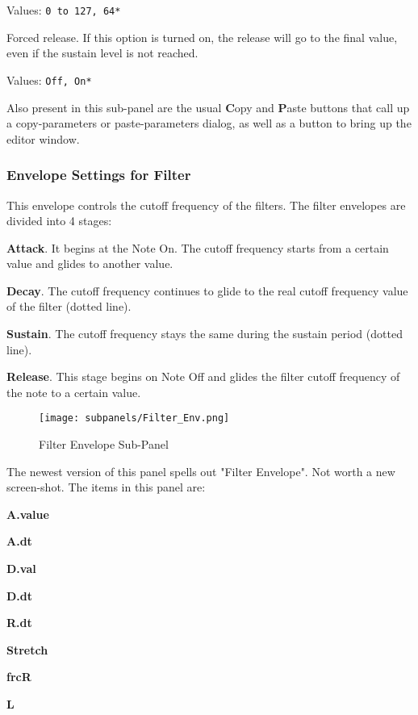    Values: \texttt{0 to 127, 64*}

   Forced release.
   If this option is turned on, the release will go to the
   final value, even if the sustain level is not reached.

   Values: \texttt{Off, On*}

   Also present in this sub-panel are the usual \textbf{C}opy
   and \textbf{P}aste buttons that call up a copy-parameters or
   paste-parameters dialog, as well as a button
   to bring up the editor window.

\subsubsection{Envelope Settings for Filter}
\label{subsubsec:envelope_settings_for_filter}

   This envelope controls the cutoff frequency of the filters.
   The filter envelopes are divided into 4 stages:

   \begin{enumber}
      \item \textbf{Attack}.
         It begins at the Note On.
         The cutoff frequency starts from a certain value and glides to another
         value.
      \item \textbf{Decay}.
         The cutoff frequency continues to glide to the real cutoff frequency
         value of the filter (dotted line).
      \item \textbf{Sustain}.
         The cutoff frequency stays the same during the sustain period (dotted
         line).
      \item \textbf{Release}.
         This stage begins on Note Off and glides the filter cutoff frequency
         of the note to a certain value.
   \end{enumber}

\begin{figure}[H]
   \centering
   \texttt{[image: subpanels/Filter\_Env.png]}
   \caption[Filter Envelope Sub-Panel]{Filter Envelope Sub-Panel}
   \label{fig:filter_env}
\end{figure}

   The newest version of this panel spells out "Filter Envelope".
   Not worth a new screen-shot.
   The items in this panel are:

   \begin{enumber}
      \item \textbf{A.value}
      \item \textbf{A.dt}
      \item \textbf{D.val}
      \item \textbf{D.dt}
      \item \textbf{R.dt}
      \item \textbf{Stretch}
      \item \textbf{frcR}
      \item \textbf{L}
   \end{enumber}


